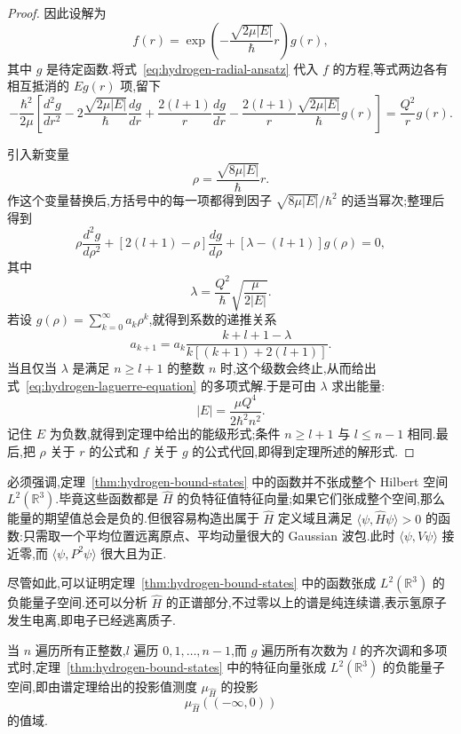 {\begin{proof}
因此设解为
\[
 f(r)=\exp\left(-\frac{\sqrt{2\mu|E|}}{\hbar}r\right)g(r),
\label{eq:hydrogen-radial-ansatz}
\]
其中 $g$ 是待定函数.将式~\eqref{eq:hydrogen-radial-ansatz} 代入 $f$ 的方程,等式两边各有相互抵消的 $Eg(r)$ 项,留下
\[
 -\frac{\hbar^2}{2\mu}\left[\frac{d^2g}{dr^2}-2\frac{\sqrt{2\mu|E|}}{\hbar}\frac{dg}{dr}+\frac{2(l+1)}r\frac{dg}{dr}-\frac{2(l+1)}r\frac{\sqrt{2\mu|E|}}{\hbar}g(r)\right]
 =\frac{Q^2}{r}g(r).
\]

引入新变量
\[
 \rho=\frac{\sqrt{8\mu|E|}}{\hbar}r.
\]
作这个变量替换后,方括号中的每一项都得到因子 $\sqrt{8\mu|E|}/\hbar^2$ 的适当幂次;整理后得到
\[
 \rho\frac{d^2g}{d\rho^2}+[2(l+1)-\rho]\frac{dg}{d\rho}
 +\left[\lambda-(l+1)\right]g(\rho)=0,
\label{eq:hydrogen-laguerre-equation}
\]
其中
\[
 \lambda=\frac{Q^2}{\hbar}\sqrt{\frac{\mu}{2|E|}}.
\]
若设 $g(\rho)=\sum_{k=0}^{\infty}a_k\rho^k$,就得到系数的递推关系
\[
 a_{k+1}=a_k\frac{k+l+1-\lambda}{k[(k+1)+2(l+1)]}.
\label{eq:hydrogen-laguerre-recurrence}
\]
当且仅当 $\lambda$ 是满足 $n\ge l+1$ 的整数 $n$ 时,这个级数会终止,从而给出式~\eqref{eq:hydrogen-laguerre-equation} 的多项式解.于是可由 $\lambda$ 求出能量:
\[
 |E|=\frac{\mu Q^4}{2\hbar^2n^2}.
\]
记住 $E$ 为负数,就得到定理中给出的能级形式;条件 $n\ge l+1$ 与 $l\le n-1$ 相同.最后,把 $\rho$ 关于 $r$ 的公式和 $f$ 关于 $g$ 的公式代回,即得到定理所述的解形式.
\end{proof}

必须强调,定理~\ref{thm:hydrogen-bound-states} 中的函数并不张成整个 Hilbert 空间 $L^2(\mathbb R^3)$.毕竟这些函数都是 $\widehat H$ 的负特征值特征向量;如果它们张成整个空间,那么能量的期望值总会是负的.但很容易构造出属于 $\widehat H$ 定义域且满足 $\langle\psi,\widehat H\psi\rangle>0$ 的函数:只需取一个平均位置远离原点、平均动量很大的 Gaussian 波包.此时 $\langle\psi,V\psi\rangle$ 接近零,而 $\langle\psi,P^2\psi\rangle$ 很大且为正.

尽管如此,可以证明定理~\ref{thm:hydrogen-bound-states} 中的函数张成 $L^2(\mathbb R^3)$ 的负能量子空间.还可以分析 $\widehat H$ 的正谱部分,不过零以上的谱是纯连续谱,表示氢原子发生电离,即电子已经逃离质子.

\begin{theorem}[氢原子的负能量子空间]\label{thm:hydrogen-negative-spectrum}
当 $n$ 遍历所有正整数,$l$ 遍历 $0,1,\ldots,n-1$,而 $g$ 遍历所有次数为 $l$ 的齐次调和多项式时,定理~\ref{thm:hydrogen-bound-states} 中的特征向量张成 $L^2(\mathbb R^3)$ 的负能量子空间,即由谱定理给出的投影值测度 $\mu_{\widehat H}$ 的投影
\[
 \mu_{\widehat H}((-\infty,0))
\]
的值域.
\end{theorem}

}
